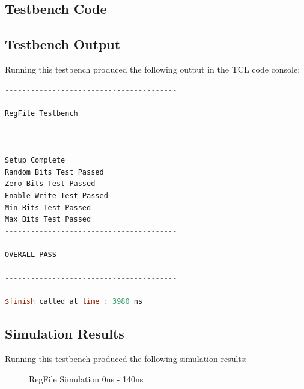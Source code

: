 \documentclass[
    a4paper, %
	12pt, %
    ]{CSSullivanBusinessReport}
\begin{document}
\begin{fullwidth}
\captionsetup{style=widetable}
\subsection{Testbench Code} %



\newpage
\subsection{Testbench Output} %
Running this testbench produced the following output in the TCL code console:

\begin{lstlisting}[language=Verilog, caption=TCl Output from ProgramCounterEnv\_TB]
----------------------------------------

RegFile Testbench

----------------------------------------

Setup Complete
Random Bits Test Passed
Zero Bits Test Passed
Enable Write Test Passed
Min Bits Test Passed
Max Bits Test Passed
----------------------------------------

OVERALL PASS

----------------------------------------

$finish called at time : 3980 ns
\end{lstlisting}

\newpage
\subsection{Simulation Results} %

Running this testbench produced the following simulation results:

\begin{figure}[H]
    \centering
    \captionsetup{style=widetable}
    \caption{RegFile Simulation 0ns - 140ns}
    \label{fig:regfilesim1}
\end{figure}


\end{fullwidth}
\end{document}
